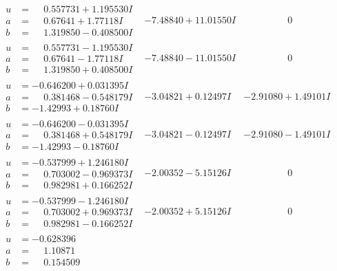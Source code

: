 \documentclass[1p]{elsarticle_modified}
\theoremstyle{definition}
\begin{document}
$$\begin{array}{c|c|c}
\begin{aligned}
u &= \phantom{-}0.557731 + 1.195530 I \\
a &= \phantom{-}0.67641 + 1.77118 I \\
b &= \phantom{-}1.319850 - 0.408500 I\end{aligned}
 & -7.48840 + 11.01550 I & \phantom{-0.000000 } 0 \\ \hline\begin{aligned}
u &= \phantom{-}0.557731 - 1.195530 I \\
a &= \phantom{-}0.67641 - 1.77118 I \\
b &= \phantom{-}1.319850 + 0.408500 I\end{aligned}
 & -7.48840 - 11.01550 I & \phantom{-0.000000 } 0 \\ \hline\begin{aligned}
u &= -0.646200 + 0.031395 I \\
a &= \phantom{-}0.381468 - 0.548179 I \\
b &= -1.42993 + 0.18760 I\end{aligned}
 & -3.04821 + 0.12497 I & -2.91080 + 1.49101 I \\ \hline\begin{aligned}
u &= -0.646200 - 0.031395 I \\
a &= \phantom{-}0.381468 + 0.548179 I \\
b &= -1.42993 - 0.18760 I\end{aligned}
 & -3.04821 - 0.12497 I & -2.91080 - 1.49101 I \\ \hline\begin{aligned}
u &= -0.537999 + 1.246180 I \\
a &= \phantom{-}0.703002 - 0.969373 I \\
b &= \phantom{-}0.982981 + 0.166252 I\end{aligned}
 & -2.00352 - 5.15126 I & \phantom{-0.000000 } 0 \\ \hline\begin{aligned}
u &= -0.537999 - 1.246180 I \\
a &= \phantom{-}0.703002 + 0.969373 I \\
b &= \phantom{-}0.982981 - 0.166252 I\end{aligned}
 & -2.00352 + 5.15126 I & \phantom{-0.000000 } 0 \\ \hline\begin{aligned}
u &= -0.628396\phantom{ +0.000000I} \\
a &= \phantom{-}1.10871\phantom{ +0.000000I} \\
b &= \phantom{-}0.154509\phantom{ +0.000000I}\end{aligned}

\end{array}$$
\end{document}
